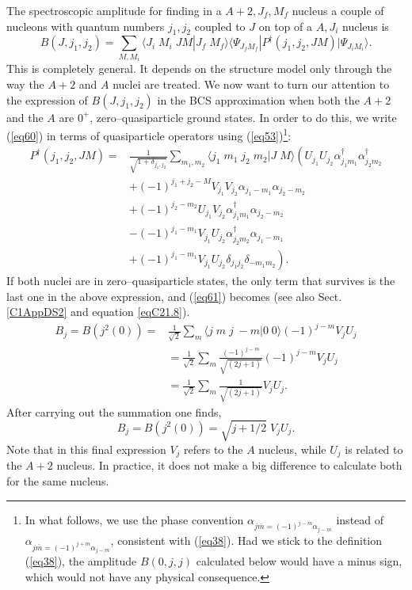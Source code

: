 \begin{subappendices}
The spectroscopic amplitude for finding in a $A+2,J_f,M_f$ nucleus a couple of nucleons with quantum numbers $j_1,j_2$ coupled to $J$ on top of a $A,J_i$ nucleus is
\begin{equation}\label{eq61}
B(J,j_1,j_2)=\sum_{M,M_i} \langle J_i \; M_i \; J M|J_f \; M_f\rangle \langle \Psi_{J_f M_f}|P^\dagger(j_1,j_2,J M)|\Psi_{J_i M_i}\rangle.
\end{equation}
This is completely general. It depends on the structure model only through the way the $A+2$ and $A$ nuclei are treated. We now want to turn our attention to the expression of $B(J,j_1,j_2)$ in the BCS approximation when both the $A+2$ and the $A$ are $0^+$, zero--quasiparticle ground states. In order to do this, we write (\ref{eq60}) in terms of quasiparticle operators using (\ref{eq53})\footnote{In what follows, we use the phase convention $\alpha_{j \bar m=(-1)^{j-m}\alpha_{j-m}}$ instead of $\alpha_{j \bar m=(-1)^{j+m}\alpha_{j-m}}$, consistent with (\ref{eq38}). Had we stick to the definition (\ref{eq38}), the amplitude $B(0,j,j)$ calculated below would have a minus sign, which would not have any physical consequence.}:
\begin{equation}\label{eq62}
    \begin{split}
       P^\dagger(j_1,j_2,J M)= & \frac{1}{\sqrt{1+\delta_{j_1,j_2}}}\sum_{m_1,m_2} \langle j_1 \; m_1 \;j_2 \;m_2|J \; M\rangle \left( U_{j_1}U_{j_2}\alpha_{j_1m_1}^\dagger\alpha_{j_2m_2}^\dagger\right.\\
         &  +(-1)^{j_1+j_2-M}V_{j_1}V_{j_2}\alpha_{j_1-m_1}\alpha_{j_2-m_2}\\
         &+(-1)^{j_2-m_2}U_{j_1}V_{j_2}\alpha_{j_1m_1}^\dagger
         \alpha_{j_2-m_2}\\
         &-(-1)^{j_1-m_1} V_{j_1}U_{j_2}\alpha_{j_2m_2}^\dagger\alpha_{j_1-m_1}\\
         &\left.+(-1)^{j_1-m_1} V_{j_1}U_{j_2}\delta_{j_1j_2}\delta_{-m_1m_2}\right).
     \end{split}
\end{equation}
If both nuclei are in zero--quasiparticle states, the only term that survives is the last one in the above expression, and (\ref{eq61}) becomes (see also Sect. \ref{C1AppDS2} and equation  \ref{eqC21.8}).
\begin{equation}\label{eq63}
    \begin{split}
     B_j=B(j^2(0))=& \frac{1}{\sqrt 2}\sum_{m} \langle j \; m \; j\;-m |0 \; 0\rangle (-1)^{j-m} V_jU_j\\
         &=\frac{1}{\sqrt 2}\sum_{m} \frac{(-1)^{j-m}}{\sqrt{(2j+1)}} (-1)^{j-m} V_jU_j\\
         &=\frac{1}{\sqrt 2}\sum_{m} \frac{1}{\sqrt{(2j+1)}}V_jU_j.
     \end{split}
\end{equation}
After carrying out the summation one finds,
\begin{equation}\label{eq64}
 B_j=B(j^2(0))=\sqrt{j+1/2}\;V_jU_j.
\end{equation}
Note that in this final expression $V_j$ refers to the $A$ nucleus, while $U_j$ is related to the $A+2$ nucleus. In practice, it does not make a big difference to calculate both for the same nucleus.


\end{subappendices}
